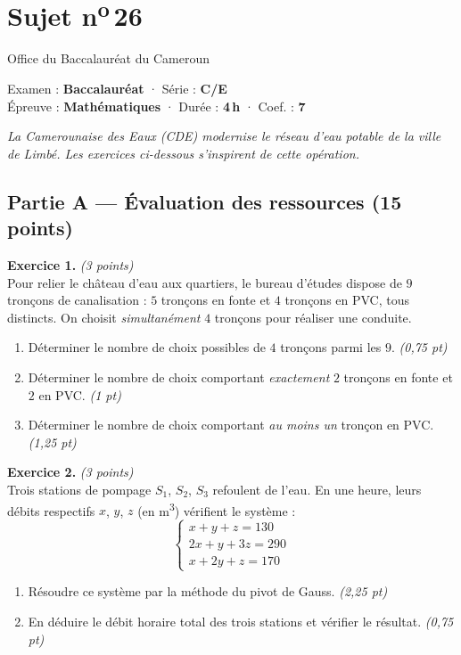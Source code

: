\section{Sujet n\textsuperscript{o}\,26}
\noindent\begin{minipage}{0.5\linewidth}\footnotesize Office du Baccalauréat du Cameroun\end{minipage}%
\hfill\begin{minipage}{0.45\linewidth}\footnotesize\raggedleft Examen : \textbf{Baccalauréat} · Série : \textbf{C/E}\\
Épreuve : \textbf{Mathématiques} · Durée : \textbf{4\,h} · Coef. : \textbf{7}\end{minipage}
\par\smallskip{\color{onbo}\rule{\linewidth}{1pt}}

\noindent\textit{La Camerounaise des Eaux (CDE) modernise le réseau d'eau potable de la ville
de Limbé. Les exercices ci-dessous s'inspirent de cette opération.}

\subsection*{Partie A — Évaluation des ressources \hfill (15 points)}

\noindent\textbf{Exercice 1.} \hfill\textit{(3 points)}\\
Pour relier le château d'eau aux quartiers, le bureau d'études dispose de $9$ tronçons de
canalisation : $5$ tronçons en fonte et $4$ tronçons en PVC, tous distincts. On choisit
\emph{simultanément} $4$ tronçons pour réaliser une conduite.
\begin{enumerate}[label=\arabic*)]
\item Déterminer le nombre de choix possibles de $4$ tronçons parmi les $9$. \hfill\textit{(0,75 pt)}
\item Déterminer le nombre de choix comportant \emph{exactement} $2$ tronçons en fonte et $2$ en PVC. \hfill\textit{(1 pt)}
\item Déterminer le nombre de choix comportant \emph{au moins un} tronçon en PVC. \hfill\textit{(1,25 pt)}
\end{enumerate}

\smallskip
\noindent\textbf{Exercice 2.} \hfill\textit{(3 points)}\\
Trois stations de pompage $S_1$, $S_2$, $S_3$ refoulent de l'eau. En une heure, leurs débits
respectifs $x$, $y$, $z$ (en m\textsuperscript{3}) vérifient le système :
\[ \begin{cases} x+y+z=130\\ 2x+y+3z=290\\ x+2y+z=170 \end{cases} \]
\begin{enumerate}[label=\arabic*)]
\item Résoudre ce système par la méthode du pivot de Gauss. \hfill\textit{(2,25 pt)}
\item En déduire le débit horaire total des trois stations et vérifier le résultat. \hfill\textit{(0,75 pt)}
\end{enumerate}

